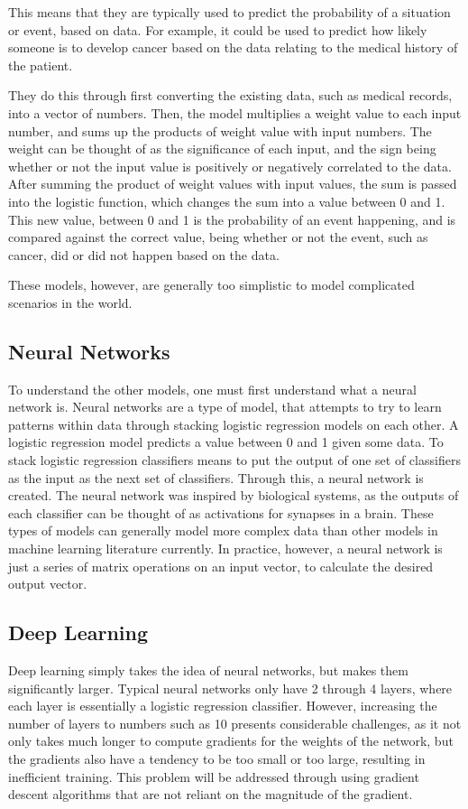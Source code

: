 \documentclass{article}
\begin{document}
This means that they are typically used to predict the probability of a
situation or event, based on data. For example, it could be used to predict how
likely someone is to develop cancer based on the data relating to the medical
history of the patient.

They do this through first converting the existing data, such as medical
records, into a vector of numbers. Then, the model multiplies a weight value to
each input number, and sums up the products of weight value with input numbers.
The weight can be thought of as the significance of each input, and the sign
being whether or not the input value is positively or negatively correlated to
the data. After summing the product of weight values with input values, the sum
is passed into the logistic function, which changes the sum into a value between
0 and 1. This new value, between 0 and 1 is the probability of an event
happening, and is compared against the correct value, being whether or not the
event, such as cancer, did or did not happen based on the data.

These models, however, are generally too simplistic to model complicated
scenarios in the world.

\subsection{Neural Networks}
To understand the other models, one must first understand what a neural network
is. Neural networks are a type of model, that attempts to try to learn patterns
within data through stacking logistic regression models on each other. A
logistic regression model predicts a value between 0 and 1 given some data.  To
stack logistic regression classifiers means to put the output of one set of
classifiers as the input as the next set of classifiers. Through this, a neural
network is created.  The neural network was inspired by biological systems, as
the outputs of each classifier can be thought of as activations for synapses in
a brain. These types of models can generally model more complex data than other
models in machine learning literature currently. In practice, however, a neural
network is just a series of matrix operations on an input vector, to calculate
the desired output vector.

\subsection{Deep Learning}
Deep learning simply takes the idea of neural networks, but makes them
significantly larger. Typical neural networks only have 2 through 4 layers,
where each layer is essentially a logistic regression classifier. However,
increasing the number of layers to numbers such as 10 presents considerable
challenges, as it not only takes much longer to compute gradients for the
weights of the network, but the gradients also have a tendency to be too small
or too large, resulting in inefficient training. This problem will be addressed
through using gradient descent algorithms that are not reliant on the magnitude
of the gradient.
\end{document}
